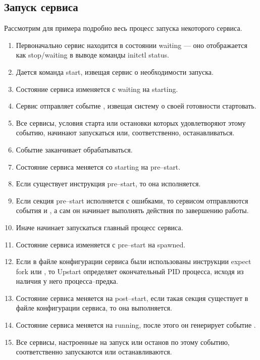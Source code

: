 \subsection*{Запуск сервиса}
Рассмотрим для примера подробно весь процесс запуска некоторого сервиса.
\begin{enumerate}
\item Первоначально сервис находится в состоянии waiting --- оно отображается как stop/waiting в выводе команды initctl status.
\item Дается команда start, извещая сервис о необходимости запуска.
\item Состояние сервиса изменяется с waiting на starting.
\item Сервис отправляет событие , извещая систему о своей готовности стартовать.
\item Все сервисы, условия старта или остановки которых удовлетворяют этому событию, начинают запускаться или, соответственно, останавливаться.
\item Событие  заканчивает обрабатываться.
\item Состояние сервиса меняется со starting на pre--start.
\item Если существует инструкция pre--start, то она исполняется.
\item Если секция pre--start исполняется с ошибками, то сервисом отправляются события  и 
, а сам он начинает выполнять действия по завершению работы.
\item Иначе начинает запускаться главный процесс сервиса. 
\item Состояние сервиса изменяется с pre--start на spawned.
\item Если в файле конфигурации сервиса были использованы инструкции expect fork или , то Upstart определяет окончательный PID процесса, исходя из наличия у него процесса--предка.
\item Состояние сервиса меняется на post--start, если такая секция существует в файле конфигурации сервиса, то она выполняется.
\item Состояние сервиса меняется на running, после этого он генерирует событие . 
\item Все сервисы, настроенные на запуск или останов по этому событию, соответственно запускаются или останавливаются.
\end{enumerate}
